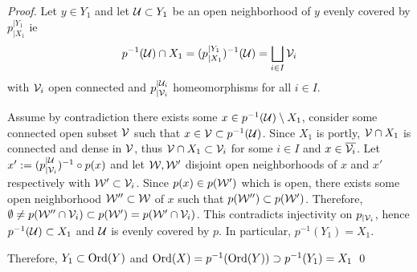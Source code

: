 \begin{proof}
 Let $y\in Y_1$ and let $\mathcal{U}\subset Y_1$ be an open neighborhood 
 of $y$ evenly covered by $p_{|X_1}^{|Y_1}$ ie
 $$p^{-1}(\mathcal{U})\cap X_1 = (p_{|X_1}^{|Y_1})^{-1}(\mathcal{U})=\bigsqcup_{i\in I} \mathcal V_i$$
 with $\mathcal V_i$ open connected and $p_{|\mathcal V_i}^{|\mathcal{U}_i}$ homeomorphisms for all $i\in I$. 
 
 Assume by contradiction there exists some $x\in p^{-1}(\mathcal{U})\setminus X_1$, consider some connected open subset  $\mathcal V$ such that $x\in \mathcal V\subset p^{-1}(\mathcal{U})$. Since $X_1$ is portly, $\mathcal V\cap X_1$ is connected and dense in $\mathcal V$, thus  $\mathcal V\cap X_1 \subset \mathcal V_i$ for some $i\in I$ and $x\in \overline{\mathcal V_i}$. Let $x':= (p_{|\mathcal V_i}^{|\mathcal{U}})^{-1}\circ p(x)$ and let $\mathcal W,\mathcal W'$ disjoint open neighborhoods of $x$ and $x'$ respectively with $\mathcal W'\subset \mathcal V_i$. Since $p(x) \in p(\mathcal W')$ which is open, there exists some open neighborhood $\mathcal W''\subset \mathcal W$  of $x$ such that $p(\mathcal W'')\subset p(\mathcal W')$. Therefore, $\emptyset \neq p(\mathcal W''\cap \mathcal V_i) \subset p(\mathcal W')=p(\mathcal W'\cap \mathcal V_i)$. This contradicts injectivity on $p_{|\mathcal V_i}$, hence $p^{-1}(\mathcal{U})\subset X_1$ and $\mathcal{U}$ is evenly covered by $p$. In particular, $p^{-1}(Y_1) = X_1$.
 
 Therefore, $Y_1\subset \mathrm{Ord}(Y)$ and $\mathrm{Ord}(X) = p^{-1}(\mathrm{Ord}(Y)) \supset p^{-1}(Y_1) = X_1$
\qed\end{proof}

